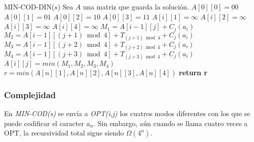 \begin{algorithmic}[1]
\item[]{MIN-COD-DIN($s$)}
\State Sea $A$ una matriz que guarda la solución.
\State $A[0][0] = 00$ 
\State $A[0][1] = 01$ 
\State $A[0][2] = 10$ 
\State $A[0][3] = 11$
    \State $A[i][1] = \infty$
    \State $A[i][2] = \infty$
    \State $A[i][3] = \infty$
    \State $A[i][4] = \infty$
            \State $M_1 = A[i-1][j] + C_j(a_i)$
            \State $M_2 = A[i-1][(j+1)\bmod{4}] + T_{(j+1)\bmod{4}} + C_{j}(a_i)$
            \State $M_3 = A[i-1][(j+2)\bmod{4}] + T_{(j+2)\bmod{4}} + C_{j}(a_i)$
            \State $M_4 = A[i-1][(j+3)\bmod{4}] + T_{(j+3)\bmod{4}} + C_{j}(a_i)$
            \State $A[i][j] = min(M_1, M_2, M_3, M_4)$
            \State
        \EndIf
    \EndFor
\EndFor
\State $r = min(A[n][1], A[n][2], A[n][3], A[n][4])$
\State \textbf{return r}


\subsubsection{Complejidad}

En \emph{MIN-COD(s)} se envía a \emph{OPT(i,j)} los cuatros modos diferentes con los que se puede codificar el caracter 
$a_n$. Sin embargo, aún cuando se llama cuatro veces a OPT, la recursividad total sigue siendo $\Omega(4^n)$.

\end{algorithmic}
